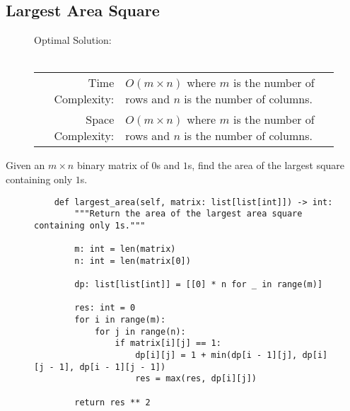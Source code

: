 
\subsection{Largest Area Square}

\begin{figure}[H]
    Optimal Solution:\\\\
    \begin{tabular}{rl}
        Time Complexity:& \(O(m \times n)\) where \(m\) is the number of rows
        and \(n\) is the number of columns.\\
        Space Complexity:& \(O(m \times n)\) where \(m\) is the number of rows
        and \(n\) is the number of columns.
    \end{tabular}
\end{figure}

Given an \(m \times n\) binary matrix of \(0\)s and \(1\)s, find the area
of the largest square containing only \(1\)s.

\begin{figure}[H]
    \centering
    \begin{verbatim}
    def largest_area(self, matrix: list[list[int]]) -> int:
        """Return the area of the largest area square containing only 1s."""

        m: int = len(matrix)
        n: int = len(matrix[0])

        dp: list[list[int]] = [[0] * n for _ in range(m)]

        res: int = 0
        for i in range(m):
            for j in range(n):
                if matrix[i][j] == 1:
                    dp[i][j] = 1 + min(dp[i - 1][j], dp[i][j - 1], dp[i - 1][j - 1])
                    res = max(res, dp[i][j])

        return res ** 2
    \end{verbatim}
\end{figure}
